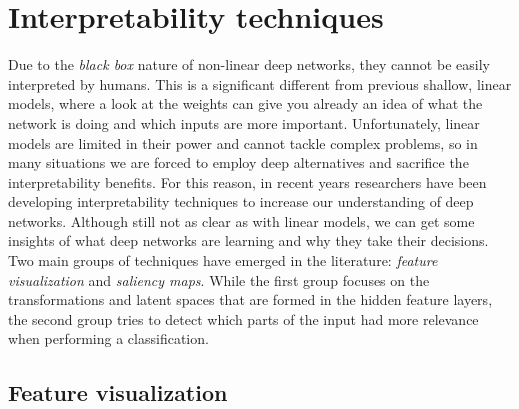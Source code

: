 	
	
	

\section{Interpretability techniques}

Due to the \textit{black box} nature of non-linear deep networks, they cannot be easily interpreted by humans. This is a significant different from previous shallow, linear models, where a look at the weights can give you already an idea of what the network is doing and which inputs are more important. Unfortunately, linear models are limited in their power and cannot tackle complex problems, so in many situations we are forced to employ deep alternatives and sacrifice the interpretability benefits. For this reason, in recent years researchers have been developing interpretability techniques to increase our understanding of deep networks. Although still not as clear as with linear models, we can get some insights of what deep networks are learning and why they take their decisions. Two main groups of techniques have emerged in the literature: \textit{feature visualization} and \textit{saliency maps}. While the first group focuses on the transformations and latent spaces that are formed in the hidden feature layers, the second group tries to detect which parts of the input had more relevance when performing a classification.

	\subsection{Feature visualization}\label{sect:featvis}
	
